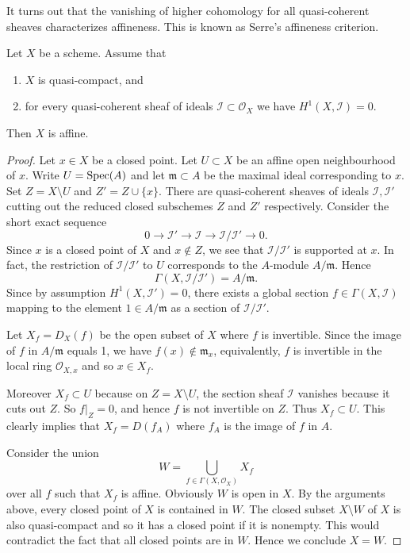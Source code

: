\documentclass[12pt]{article}
\begin{document}
It turns out that the vanishing of higher cohomology for all quasi-coherent sheaves characterizes affineness. This is known as Serre's affineness criterion.
\begin{theorem}
\label{theorem:serre-affine}
Let $X$ be a scheme. Assume that
\begin{enumerate}
\item $X$ is quasi-compact, and
\item for every quasi-coherent sheaf of ideals $\mathcal{I}\subset\mathcal{O}_X$ we have $H^1(X,\mathcal{I})=0$.
\end{enumerate}
Then $X$ is affine.
\end{theorem}

\begin{proof}
Let $x\in X$ be a closed point. Let $U\subset X$ be an affine open neighbourhood of $x$. 
Write $U=\operatorname{Spec}(A)$ and let $\mathfrak m\subset A$ be the maximal ideal corresponding to $x$. 
Set $Z = X\setminus U$ and $Z' = Z\cup\{x\}$. 
There are quasi-coherent sheaves of ideals $\mathcal{I},\mathcal{I}'$ cutting out the reduced closed subschemes $Z$ and $Z'$ respectively. 
Consider the short exact sequence
\[
0 \longrightarrow \mathcal{I}' \longrightarrow \mathcal{I} \longrightarrow \mathcal{I}/\mathcal{I}' \longrightarrow 0.
\]
Since $x$ is a closed point of $X$ and $x\notin Z$, we see that $\mathcal{I}/\mathcal{I}'$ is supported at $x$. 
In fact, the restriction of $\mathcal{I}/\mathcal{I}'$ to $U$ corresponds to the $A$-module $A/\mathfrak m$. 
Hence
\[
\Gamma(X,\mathcal{I}/\mathcal{I}') = A/\mathfrak m.
\]
Since by assumption $H^1(X,\mathcal{I}')=0$, there exists a global section 
$f\in\Gamma(X,\mathcal{I})$ mapping to the element $1\in A/\mathfrak m$ as a section of 
$\mathcal{I}/\mathcal{I}'$. 

Let $X_f = D_X(f)$ be the open subset of $X$ where $f$ is invertible.
Since the image of $f$ in $A / \mathfrak m$ equals 1, we have $f(x) \notin \mathfrak m_x$, equivalently, $f$ is invertible in the local ring $\mathcal O_{X, x}$ and so $x \in X_f$.

Moreover $X_f\subset U$ because on $Z = X\setminus U$, the section sheaf $\mathcal{I}$ vanishes because it cuts out $Z$. So $f\vert_Z = 0$, and hence $f$ is not invertible on $Z$. Thus $X_f\subset U$. This clearly implies that $X_f = D(f_A)$ where $f_A$ is the image of $f$ in $A$.

Consider the union
\[
W = \bigcup_{f\in\Gamma(X,\mathcal{O}_X)} X_f
\]
over all $f$ such that $X_f$ is affine. 
Obviously $W$ is open in $X$. 
By the arguments above, every closed point of $X$ is contained in $W$. 
The closed subset $X\setminus W$ of $X$ is also quasi-compact and so it has a closed point if it is nonempty. This would contradict the fact that all closed points are in $W$. Hence we conclude $X=W$.


\end{proof}
\end{document}

